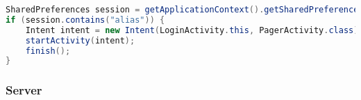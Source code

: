 \begin{lstlisting}[language=java, label={lst:login_check}, caption={Checking whether the user should login}]
SharedPreferences session = getApplicationContext().getSharedPreferences(getString(R.string.app_name), 0);
if (session.contains("alias")) {
    Intent intent = new Intent(LoginActivity.this, PagerActivity.class);
    startActivity(intent);
    finish();
}
\end{lstlisting}  

\subsubsection{Server}